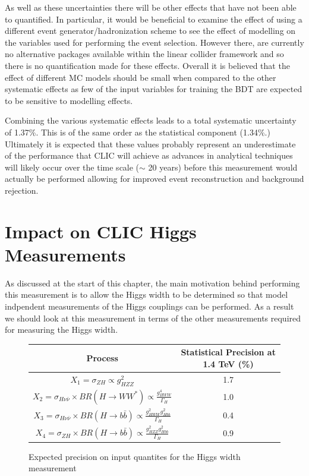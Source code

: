As well as these uncertainties there will be other effects that have not been able to quantified. In particular, it would be beneficial to examine the effect of using a different event generator/hadronization scheme to see the effect of modelling on the variables used for performing the event selection. However there, are currently no alternative packages available within the linear collider framework and so there is no quantification made for these effects. Overall it is believed that the effect of different MC models should be small when compared to the other systematic effects as few of the input variables for training the BDT are expected to be sensitive to modelling effects.

Combining the various systematic effects leads to a total systematic uncertainty of 1.37\%. This is of the same order as the statistical component (1.34\%.) Ultimately it is expected that these values probably represent an underestimate of the performance that \ac{CLIC} will achieve as advances in analytical techniques will likely occur over the time scale ($\sim$ 20 years) before this measurement would actually be performed allowing for improved event reconstruction and background rejection.  

\section{Impact on CLIC Higgs Measurements}
As discussed at the start of this chapter, the main motivation behind performing this measurement is to allow the Higgs width to be determined so that model indpendent measurements of the Higgs couplings can be performed. As a result we should look at this measurement in terms of the other measurements required for measuring the Higgs width.

\begin{figure}
  \centering
  \begin{tabular}{c c }
   \toprule
    Process & Statistical Precision at 1.4 TeV (\%)    \\
    \midrule
    $X_1=\sigma_{ZH} \propto g_{HZZ}^2$ & 1.7 \\
    \midrule
    $X_2=\sigma_{H\nu\bar{\nu}} \times BR(H\rightarrow WW^*) \propto \frac{g_{HWW}^4}{\Gamma_H}$ & 1.0\\
    \midrule
    $X_3=\sigma_{H\nu\bar{\nu}} \times BR(H\rightarrow b\bar{b}) \propto \frac{g_{HWW}^{2}g_{Hbb}^2}{\Gamma_H}$ & 0.4\\
    \midrule
    $X_4=\sigma_{ZH} \times BR(H\rightarrow b\bar{b}) \propto \frac{g_{HZZ}^{2}g_{Hbb}^2}{\Gamma_H}$ & 0.9 \\
    \bottomrule
  \end{tabular}
  \caption[Expected precision on input quantites for the Higgs width measurement]{Expected precision on input quantites for the Higgs width measurement}
  \label{fig:higgscomparison}
\end{figure}

